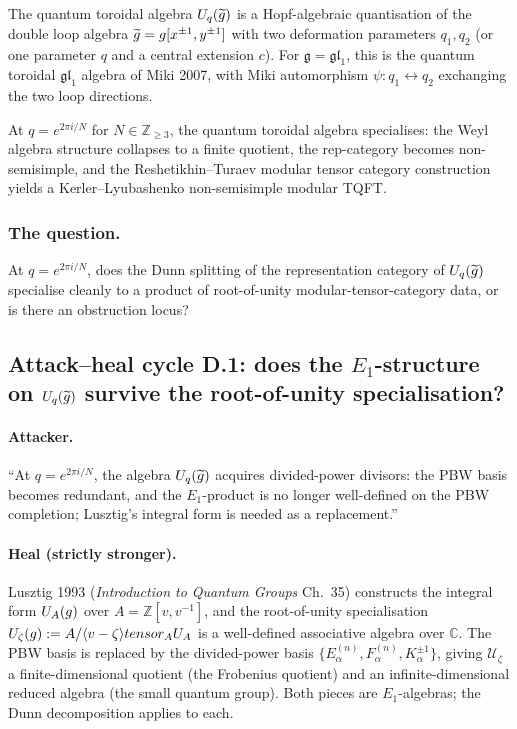 \documentclass[11pt]{article}
\newcommand{\Eone}{E_{1}}
\newcommand{\C}{\mathbb{C}}
\newcommand{\Z}{\mathbb{Z}}
\newcommand{\cU}{\mathcal{U}}
\newcommand{\frakg}{\mathfrak{g}}
\newcommand{\fgl}{\mathfrak{gl}}
\begin{document}
The quantum toroidal algebra $\cU_q(\widetilde{\widehat\frakg})$ is a
Hopf-algebraic quantisation of the double loop algebra
$\widetilde{\widehat\frakg} = \frakg[x^{\pm 1}, y^{\pm 1}]$ with two
deformation parameters $q_1, q_2$ (or one parameter $q$ and a central
extension $c$). For $\frakg = \fgl_1$, this is the quantum toroidal
$\fgl_1$ algebra of Miki 2007, with Miki automorphism
$\psi : q_1 \leftrightarrow q_2$ exchanging the two loop directions.

At $q = e^{2\pi i/N}$ for $N \in \Z_{\geq 3}$, the quantum toroidal
algebra specialises: the Weyl algebra structure collapses to a finite
quotient, the rep-category becomes non-semisimple, and the
Reshetikhin--Turaev modular tensor category construction yields a
Kerler--Lyubashenko non-semisimple modular TQFT.

\subsubsection*{The question.}
At $q = e^{2\pi i/N}$, does the Dunn splitting of the representation
category of $\cU_q(\widetilde{\widehat\frakg})$ specialise cleanly to
a product of root-of-unity modular-tensor-category data, or is there
an obstruction locus?

\subsection{Attack--heal cycle D.1: does the $\Eone$-structure on
$\cU_q(\widetilde{\widehat\frakg})$ survive the root-of-unity
specialisation?}

\paragraph{Attacker.}
``At $q = e^{2\pi i/N}$, the algebra $\cU_q(\widetilde{\widehat\frakg})$
acquires divided-power divisors: the PBW basis becomes redundant, and
the $\Eone$-product is no longer well-defined on the PBW completion;
Lusztig's integral form is needed as a replacement.''

\paragraph{Heal (strictly stronger).}
Lusztig 1993 (\emph{Introduction to Quantum Groups} Ch.~35) constructs
the integral form $\cU_A(\widehat\frakg)$ over $A = \Z[v, v^{-1}]$, and
the root-of-unity specialisation $\cU_\zeta(\widehat\frakg) := A/\langle
v - \zeta\rangle \otimes_A \cU_A$ is a well-defined associative algebra
over $\C$. The PBW basis is replaced by the divided-power basis
$\{E_\alpha^{(n)}, F_\alpha^{(n)}, K_\alpha^{\pm 1}\}$, giving
$\cU_\zeta$ a finite-dimensional quotient (the Frobenius quotient)
and an infinite-dimensional reduced algebra (the small quantum group).
Both pieces are $\Eone$-algebras; the Dunn decomposition applies to each.
\end{document}
